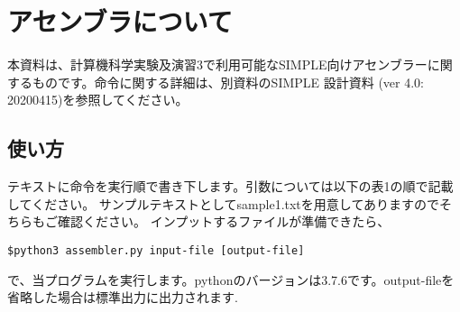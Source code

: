\documentclass[a4paper,11pt,titlepage]{ltjsarticle}%
\begin{document}

\section{アセンブラについて}
本資料は、計算機科学実験及演習3で利用可能なSIMPLE向けアセンブラーに関するものです。命令に関する詳細は、別資料のSIMPLE 設計資料 (ver 4.0: 20200415)を参照してください。
\subsection{使い方}
テキストに命令を実行順で書き下します。引数については以下の表1の順で記載してください。
サンプルテキストとしてsample1.txtを用意してありますのでそちらもご確認ください。
インプットするファイルが準備できたら、
\begin{lstlisting}[label=fuga]
$python3 assembler.py input-file [output-file]
\end{lstlisting}
で、当プログラムを実行します。pythonのバージョンは3.7.6です。output-fileを省略した場合は標準出力に出力されます.
\end{document}
